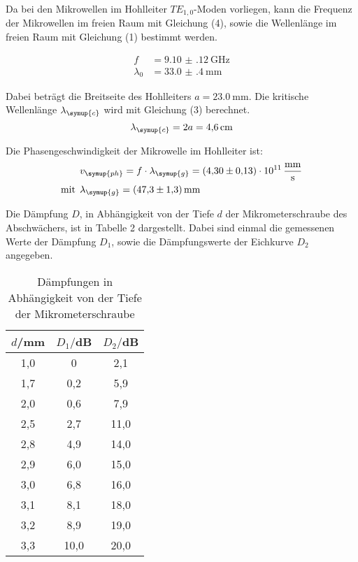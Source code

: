 Da bei den Mikrowellen im Hohlleiter $TE_{1,0}$-Moden vorliegen, kann die Frequenz der
Mikrowellen im freien Raum mit Gleichung (4), sowie die Wellenlänge im freien Raum mit Gleichung (1)
bestimmt werden.

\begin{align*}
  f &= \SI{9.10(12)}{\giga\hertz} \\
  \lambda_{0} &= \SI{33.0(4)}{\milli\meter}
\end{align*}

Dabei beträgt die Breitseite des Hohlleiters $a= \SI{23.0}{\milli\meter}$.
Die kritische Wellenlänge $\lambda_{\symup{c}}$ wird mit Gleichung (3) berechnet.
\begin{equation*}
  \lambda_{\symup{c}} = 2a = \SI{4.6}{\centi\meter}
\end{equation*}

Die Phasengeschwindigkeit der Mikrowelle im Hohlleiter ist:
\begin{align*}
  &v_{\symup{ph}} = f \cdot \lambda_{\symup{g}} = \SI{4.30(13)e11}{\milli\meter\per\second} \\
\text{mit}\:\:  &\lambda_{\symup{g}} =\SI{47.3(13)}{\milli\meter}
\end{align*}

Die Dämpfung $D$, in Abhängigkeit von der Tiefe $d$ der Mikrometerschraube des Abschwächers, ist in Tabelle 2
dargestellt. Dabei sind einmal die gemessenen Werte der Dämpfung $D_1$, sowie die Dämpfungswerte der
Eichkurve $D_2$ angegeben.


\begin{table}[H]
  \centering
  \caption{Dämpfungen in Abhängigkeit von der Tiefe der Mikrometerschraube}
  \label{tab:Parameter}
  \begin{tabular}{c c c}
    \toprule
    $d$/mm & $D_1/$dB & $D_2/$dB\\
    \midrule
    1,0 &  0  & 2,1    \\
    1,7 &  0,2  & 5,9    \\
    2,0 &  0,6  & 7,9    \\
    2,5 &  2,7  & 11,0    \\
    2,8 &  4,9  & 14,0    \\
    2,9 &  6,0  & 15,0    \\
    3,0 &  6,8  & 16,0    \\
    3,1 &  8,1  & 18,0    \\
    3,2 &  8,9  & 19,0    \\
    3,3 &  10,0 & 20,0    \\
    \bottomrule
  \end{tabular}
\end{table}

